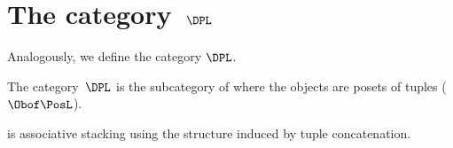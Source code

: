 
\section{The category~$\DPL$}

Analogously, we define the category $\DPL$.

\begin{definition}\label{def:DPL}
    The category~$\DPL$ is the subcategory of \DP where the objects are posets of tuples ($\Obof\PosL$).
\end{definition}
\begin{lemma}
    \DPL is associative stacking using the structure induced by tuple concatenation.
\end{lemma}
